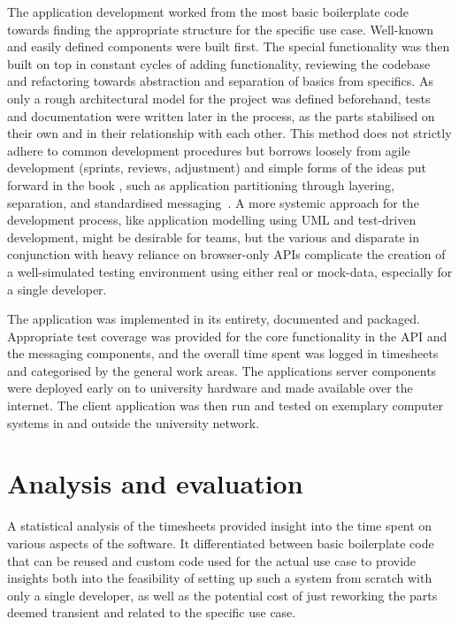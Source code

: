 The application development worked from the most basic boilerplate code towards finding the appropriate structure for the specific use case.
Well-known and easily defined components were built first.
The special functionality was then built on top in constant cycles of adding functionality, reviewing the codebase and refactoring towards abstraction and separation of basics from specifics.
As only a rough architectural model for the project was defined beforehand, tests and documentation were written later in the process, as the parts stabilised on their own and in their relationship with each other.
This method does not strictly adhere to common development procedures but borrows loosely from agile development (sprints, reviews, adjustment) and simple forms of the ideas put forward in the book , such as application partitioning through layering, separation, and standardised messaging~\parencite{patternOrientedSoftwareArchitecture}.
A more systemic approach for the development process, like application modelling using \ac{UML} and test-driven development, might be desirable for teams, but the various and disparate  in conjunction with heavy reliance on browser-only \ac{API}s complicate the creation of a well-simulated testing environment using either real or mock-data, especially for a single developer.

The application was implemented in its entirety, documented and packaged.
Appropriate test coverage was provided for the core functionality in the API and the messaging components, and the overall time spent was logged in timesheets and categorised by the general work areas.
The application\textquotesingle s server components were deployed early on to university hardware and made available over the internet.
The client application was then run and tested on exemplary computer systems in and outside the university network.

\section{Analysis and evaluation}
\label{sec:analysis-evaluation}

A statistical analysis of the timesheets provided insight into the time spent on various aspects of the software.
It differentiated between basic boilerplate code that can be reused and custom code used for the actual use case to provide insights both into the feasibility of setting up such a system from scratch with only a single developer, as well as the potential cost of just reworking the parts deemed transient and related to the specific use case.

